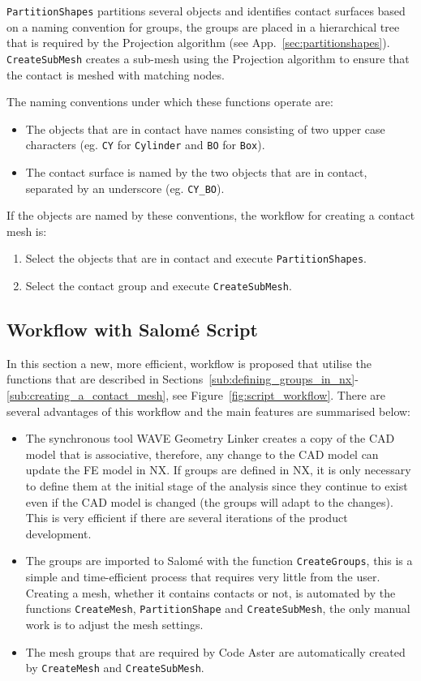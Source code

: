 \texttt{PartitionShapes} partitions several objects and identifies contact surfaces based on a naming convention for groups, the groups are placed in a hierarchical tree that is required by the Projection algorithm (see App.~\ref{sec:partitionshapes}). \texttt{CreateSubMesh} creates a sub-mesh using the Projection algorithm to ensure that the contact is meshed with matching nodes.

The naming conventions under which these functions operate are:
\begin{itemize}
	\item The objects that are in contact have names consisting of two upper case characters (eg. \texttt{CY} for \texttt{Cylinder} and \texttt{BO} for \texttt{Box}).
	\item The contact surface is named by the two objects that are in contact, separated by an underscore (eg. \texttt{CY\_BO}).
\end{itemize}
If the objects are named by these conventions, the workflow for creating a contact mesh is:
\begin{enumerate}
	\item Select the objects that are in contact and execute \texttt{PartitionShapes}.
	\item Select the contact group and execute \texttt{CreateSubMesh}.
\end{enumerate}

\subsection{Workflow with Salomé Script} %
\label{sub:workflow_with_salom_script}
In this section a new, more efficient, workflow is proposed that utilise the functions that are described in Sections~\ref{sub:defining_groups_in_nx}-\ref{sub:creating_a_contact_mesh}, see Figure~\ref{fig:script_workflow}. There are several advantages of this workflow and the main features are summarised below:
\begin{itemize}
	\item The synchronous tool WAVE Geometry Linker creates a copy of the CAD model that is associative, therefore, any change to the CAD model can update the FE model in NX. If groups are defined in NX, it is only necessary to define them at the initial stage of the analysis since they continue to exist even if the CAD model is changed (the groups will adapt to the changes). This is very efficient if there are several iterations of the product development.
	\item The groups are imported to Salomé with the function \texttt{CreateGroups}, this is a simple and time-efficient process that requires very little from the user. Creating a mesh, whether it contains contacts or not, is automated by the functions \texttt{CreateMesh}, \texttt{PartitionShape} and \texttt{CreateSubMesh}, the only manual work is to adjust the mesh settings.
	\item The mesh groups that are required by Code Aster are automatically created by \texttt{CreateMesh} and \texttt{CreateSubMesh}.
\end{itemize}

